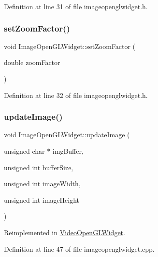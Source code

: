 Definition at line 31 of file imageopenglwidget.\+h.

\mbox{\label{class_image_open_g_l_widget_a65cd3ee1761e0960b41ba3dcbd834294}} 
\subsubsection{\texorpdfstring{setZoomFactor()}{setZoomFactor()}}
{\footnotesize\ttfamily void Image\+Open\+G\+L\+Widget\+::set\+Zoom\+Factor (\begin{DoxyParamCaption}\item[{double}]{zoom\+Factor }\end{DoxyParamCaption})\hspace{0.3cm}{\ttfamily [inline]}}



Definition at line 32 of file imageopenglwidget.\+h.

\mbox{\label{class_image_open_g_l_widget_abb7d20bc625fc370bf2757a9ec3c1ac3}} 
\subsubsection{\texorpdfstring{updateImage()}{updateImage()}}
{\footnotesize\ttfamily void Image\+Open\+G\+L\+Widget\+::update\+Image (\begin{DoxyParamCaption}\item[{unsigned char $\ast$}]{img\+Buffer,  }\item[{unsigned int}]{buffer\+Size,  }\item[{unsigned int}]{image\+Width,  }\item[{unsigned int}]{image\+Height }\end{DoxyParamCaption})\hspace{0.3cm}{\ttfamily [virtual]}}



Reimplemented in \mbox{\hyperlink{class_video_open_g_l_widget_a116b4ee59731f274ba190167e9a91283}{Video\+Open\+G\+L\+Widget}}.



Definition at line 47 of file imageopenglwidget.\+cpp.



